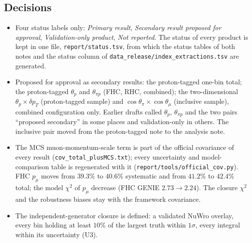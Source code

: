 \subsection{Decisions}
\begin{itemize}\itemsep1pt
  \item Four status labels only: \emph{Primary result}, \emph{Secondary result proposed for approval},
    \emph{Validation-only product}, \emph{Not reported}. The status of every product is kept in one
    file, \texttt{report/status.tsv}, from which the status tables of both notes and the status column
    of \texttt{data\_release/index\_extractions.tsv} are generated.
  \item Proposed for approval as secondary results: the proton-tagged one-bin total; the proton-tagged
    $\theta_p$ and $\theta_{\pi p}$ (FHC, RHC, combined); the two-dimensional $\theta_p\times\delta p_T$
    (proton-tagged sample) and $\cos\theta_\pi\times\cos\theta_\mu$ (inclusive sample), combined
    configuration only. Earlier drafts called $\theta_p$, $\theta_{\pi p}$ and the two pairs ``proposed
    secondary'' in some places and validation-only in others. The inclusive pair moved from the
    proton-tagged note to the analysis note.
  \item The MCS muon-momentum-scale term is part of the official covariance of every result
    (\texttt{cov\_total\_plusMCS.txt}); every uncertainty and model-comparison table is regenerated with
    it (\texttt{report/tools/official\_cov.py}). FHC $p_\mu$ moves from $39.3\%$ to $40.6\%$ systematic
    and from $41.2\%$ to $42.4\%$ total; the model $\chi^2$ of $p_\mu$ decrease (FHC GENIE $2.73\to2.24$).
    The closure $\chi^2$ and the robustness biases stay with the framework covariance.
  \item The independent-generator closure is defined: a validated NuWro overlay, every bin holding at
    least $10\%$ of the largest truth within $1\sigma$, every integral within its uncertainty (U3).
\end{itemize}

